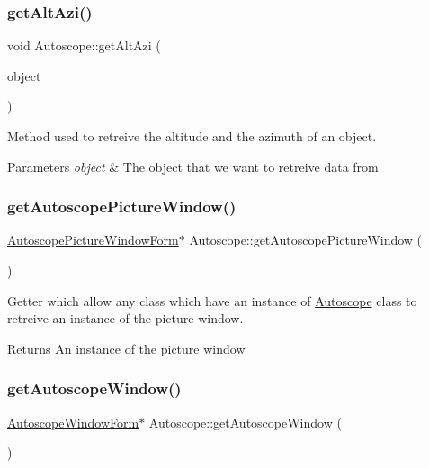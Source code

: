 \subsubsection{\texorpdfstring{getAltAzi()}{getAltAzi()}}
{\footnotesize\ttfamily void Autoscope\+::get\+Alt\+Azi (\begin{DoxyParamCaption}\item[{Stel\+ObjectP}]{object }\end{DoxyParamCaption})}



Method used to retreive the altitude and the azimuth of an object. 


\begin{DoxyParams}{Parameters}
{\em object} & The object that we want to retreive data from \\
\hline
\end{DoxyParams}
\mbox{\label{class_autoscope_a78d970ac013a0640bc28cac027737848}} 
\subsubsection{\texorpdfstring{getAutoscopePictureWindow()}{getAutoscopePictureWindow()}}
{\footnotesize\ttfamily \mbox{\hyperlink{class_autoscope_picture_window_form}{Autoscope\+Picture\+Window\+Form}}$\ast$ Autoscope\+::get\+Autoscope\+Picture\+Window (\begin{DoxyParamCaption}\item[{void}]{ }\end{DoxyParamCaption})\hspace{0.3cm}{\ttfamily [inline]}}



Getter which allow any class which have an instance of \mbox{\hyperlink{class_autoscope}{Autoscope}} class to retreive an instance of the picture window. 

\begin{DoxyReturn}{Returns}
An instance of the picture window 
\end{DoxyReturn}
\mbox{\label{class_autoscope_aad8f888c886f1f3e36878e8c3e658813}} 
\subsubsection{\texorpdfstring{getAutoscopeWindow()}{getAutoscopeWindow()}}
{\footnotesize\ttfamily \mbox{\hyperlink{class_autoscope_window_form}{Autoscope\+Window\+Form}}$\ast$ Autoscope\+::get\+Autoscope\+Window (\begin{DoxyParamCaption}\item[{void}]{ }\end{DoxyParamCaption})\hspace{0.3cm}{\ttfamily [inline]}}



